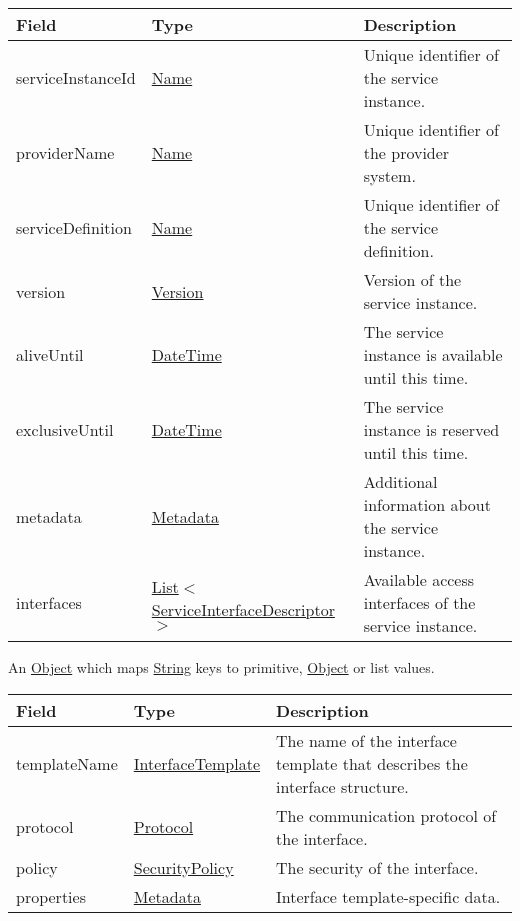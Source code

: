 \documentclass[a4paper]{arrowhead}
\newcommand{\pref}[1]{{\textcolor{ArrowheadGrey}{\hyperref[sec:model:primitives:#1]{#1}}}}
\begin{document}
\begin{table}[ht!]
\begin{tabularx}{\textwidth}{| p{3cm} | p{5.1cm} | X |} \hline
\rowcolor{gray!33} Field & Type & Description \\ \hline
serviceInstanceId & \pref{Name} & Unique identifier of the service instance. \\ \hline
providerName & \pref{Name} & Unique identifier of the provider system. \\ \hline
serviceDefinition & \pref{Name} & Unique identifier of the service definition. \\ \hline
version & \pref{Version} & Version of the service instance. \\ \hline
aliveUntil & \pref{DateTime} & The service instance is available until this time. \\ \hline
exclusiveUntil & \pref{DateTime} & The service instance is reserved until this time. \\ \hline
metadata & \hyperref[sec:model:Metadata]{Metadata} & Additional information about the service instance. \\ \hline
interfaces & \pref{List}$<$\hyperref[sec:model:ServiceInterfaceDescriptor]{ServiceInterfaceDescriptor}$>$ & Available access interfaces of the service instance. \\ \hline
\end{tabularx}
\end{table}


An \pref{Object} which maps \pref{String} keys to primitive, \pref{Object} or list values.

\clearpage

 
\begin{table}[ht!]
\begin{tabularx}{\textwidth}{| p{2.5cm} | p{3cm} | X |} \hline
\rowcolor{gray!33} Field & Type & Description \\ \hline
templateName & \pref{InterfaceTemplate} & The name of the interface template that describes the interface structure. \\ \hline
protocol & \pref{Protocol} & The communication protocol of the interface. \\ \hline
policy & \pref{SecurityPolicy} & The security of the interface. \\ \hline
properties &\hyperref[sec:model:Metadata]{Metadata} & Interface template-specific data. \\ \hline
\end{tabularx}
\end{table}
\end{document}
